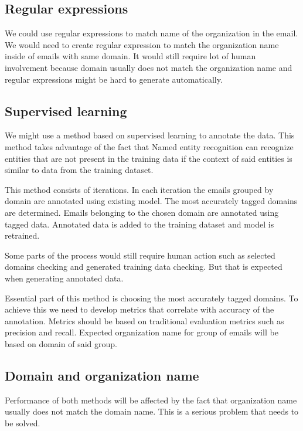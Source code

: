 \documentclass[thesis=B,english]{FITthesis}[2012/10/20]
\begin{document}
\subsection{Regular expressions}
\par We could use regular expressions to match name of the organization in the email. We would need to create regular expression to match the organization name inside of emails with same domain. It would still require lot of human involvement because domain usually does not match the organization name and regular expressions might be hard to generate automatically. 
\subsection{Supervised learning}
\par We might use a method based on supervised learning to annotate the data. This method takes advantage of the fact that Named entity recognition can recognize entities that are not present in the training data if the context of said entities is similar to data from the training dataset. 
\par This method consists of iterations. In each iteration the emails grouped by domain are annotated using existing model. The most accurately tagged domains are determined. Emails belonging to the chosen domain are annotated using tagged data. Annotated data is added to the training dataset and model is retrained.
\par Some parts of the process would still require human action such as selected domains checking and generated training data checking. But that is expected when generating annotated data.  
\par Essential part of this method is choosing the most accurately tagged domains. To achieve this we need to develop metrics that correlate with accuracy of the annotation. Metrics should be based on traditional evaluation metrics such as precision and recall. Expected organization name for group of emails will be based on domain of said group.
\subsection{Domain and organization name}
\par Performance of both methods will be affected by the fact that organization name usually does not match the domain name. This is a serious problem that needs to be solved.  
\end{document}
